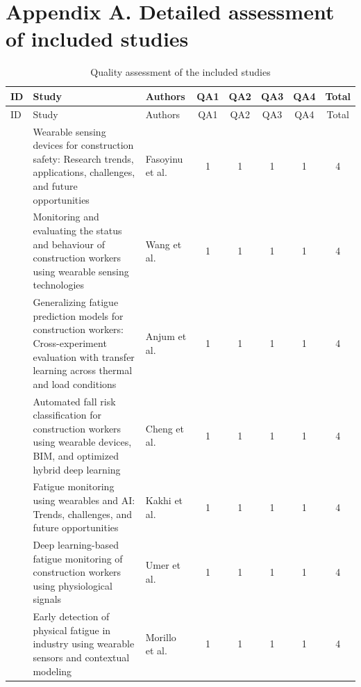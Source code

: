 \clearpage
\section*{Appendix A. Detailed assessment of included studies}
\label{AppendixA}

\begingroup
\scriptsize
\setlength{\tabcolsep}{2pt}
\renewcommand{\arraystretch}{1.1}
\begin{center}
\begin{longtable}{p{1.5cm} p{4cm} p{2.0cm} c c c c c}
\caption{Quality assessment of the included studies}\label{tab:appendixA_single}\\
\hline
ID & Study & Authors & QA1 & QA2 & QA3 & QA4 & Total \\
\hline
\endfirsthead

\hline
ID & Study & Authors & QA1 & QA2 & QA3 & QA4 & Total \\
\hline
\endhead

\hline
\endfoot

\hline
\endlastfoot

\cite{fasoyinu2025} & Wearable sensing devices for construction safety: Research trends, applications, challenges, and future opportunities & Fasoyinu et al. & 1 & 1 & 1 & 1 & 4 \\
\cite{wang2024} & Monitoring and evaluating the status and behaviour of construction workers using wearable sensing technologies  & Wang et al. & 1 & 1 & 1 & 1 & 4 \\
\cite{anjum2025} & Generalizing fatigue prediction models for construction workers: Cross-experiment evaluation with transfer learning across thermal and load conditions & Anjum et al. & 1 & 1 & 1 & 1 & 4 \\
\cite{cheng2025} & Automated fall risk classification for construction workers using wearable devices, BIM, and optimized hybrid deep learning & Cheng et al. & 1 & 1 & 1 & 1 & 4 \\
\cite{kakhi2025} & Fatigue monitoring using wearables and AI: Trends, challenges, and future opportunities & Kakhi et al. & 1 & 1 & 1 & 1 & 4 \\
\cite{umer2025} & Deep learning-based fatigue monitoring of construction workers using physiological signals & Umer et al. & 1 & 1 & 1 & 1 & 4 \\
\cite{albarran2025} & Early detection of physical fatigue in industry using wearable sensors and contextual modeling & Morillo et al. & 1 & 1 & 1 & 1 & 4 \\


\end{longtable}
\end{center}
